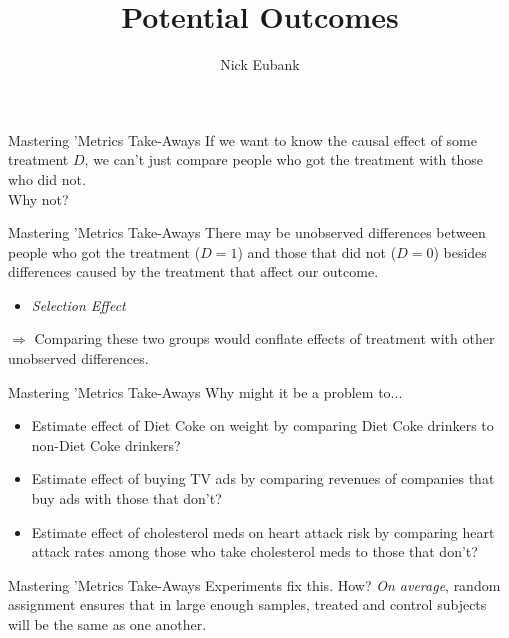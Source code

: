 \documentclass[11pt]{beamer}
\title{Potential Outcomes}
\author{\small Nick Eubank}
\date{\vspace*{.3in} \date}
\begin{document}
\begin{frame}[c]
\maketitle
\end{frame}

\begin{frame}[c]{Mastering 'Metrics Take-Aways}
  If we want to know the causal effect of some treatment $D$, \alert{we can't just compare people who got the treatment with those who did not.} \\
  \pause
  \vspace*{0.5cm}
  Why not?
\end{frame}

\begin{frame}[c]{Mastering 'Metrics Take-Aways}
There may be \alert{unobserved differences} between people who got the treatment ($D=1$) and those that did not ($D=0$) besides differences caused by the treatment \alert{that affect our outcome}.
\begin{itemize}
  \pause \item \emph{Selection Effect}
\end{itemize}
\pause $\Rightarrow$ Comparing these two groups would conflate effects of treatment with other unobserved differences.
\end{frame}


\begin{frame}[c]{Mastering 'Metrics Take-Aways}
Why might it be a problem to...
\begin{itemize}
  \pause \item Estimate effect of Diet Coke on weight by comparing Diet Coke drinkers to non-Diet Coke drinkers?
  \pause \item Estimate effect of buying TV ads by comparing revenues of companies that buy ads with those that don't?
  \pause \item Estimate effect of cholesterol meds on heart attack risk by comparing heart attack rates among those who take cholesterol meds to those that don't?
\end{itemize}
\end{frame}


\begin{frame}[c]{Mastering 'Metrics Take-Aways}
Experiments fix this. How?
\vspace{1cm}
\pause
\emph{On average}, random assignment ensures that in large enough samples, treated and control subjects will be the same as one another.
\end{frame}
\end{document}

